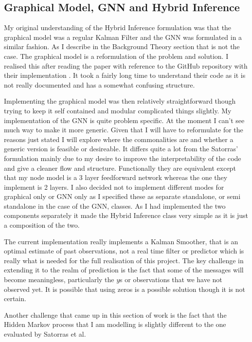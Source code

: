 \documentclass[]{../resources/final_report}
\begin{document}
\subsection{Graphical Model, GNN and Hybrid Inference}

My original understanding of the Hybrid Inference formulation was that the graphical model was a 
regular Kalman Filter and the GNN was formulated in a similar fashion. As I describe in the Background 
Theory section that is not the case. The graphical model is a reformulation of the problem and 
solution. I realised this after reading the paper with reference to the GitHub repository with their 
implementation \cite{vgsatorrasgithub}. It took a fairly long time to understand their code as it is 
not really documented and has a somewhat confusing structure.

Implementing the graphical model was then relatively straightforward though trying to keep it self 
contained and modular complicated things slightly. My implementation of the GNN is quite problem 
specific. At the moment I can't see much way to make it more generic. Given that I will have to 
reformulate for the reasons just stated I will explore where the commonalities are and whether a 
generic version is feasible or desireable. It differs quite a lot from the Satorras' formulation 
mainly due to my desire to improve the interpretability of the code and give a cleaner flow and 
structure. Functionally they are equivalent except that my node model is a 3 layer feedforward 
network whereas the one they implement is 2 layers. I also decided not to implement different 
modes for graphical only or GNN only as I specified these as separate standalone, or semi 
standalone in the case of the GNN, classes. As I had implemented the two components separately 
it made the Hybrid Inference class very simple as it is just a composition of the two.

The current implementation really implements a Kalman Smoother, that is an optimal estimate of past 
observations, not a real time filter or predictor which is really what is needed for the full 
realisation of this project. The key challenge in extending it to the realm of prediction is the fact 
that some of the messages will become meaningless, particularly the $y$s or observations that we 
have not observed yet. It is possible that using zeros is a possible solution though it is not 
certain.

Another challenge that came up in this section of work is the fact that the Hidden Markov process 
that I am modelling is slightly different to the one evaluated by Satorras et al.
\end{document}
